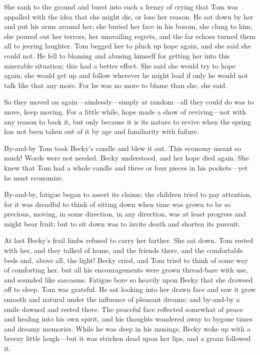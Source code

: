 \documentclass{book}
\begin{document}
She sank to the ground and burst into such a frenzy of crying that Tom was appalled with the idea that she might die, or lose her reason. He sat down by her and put his arms around her; she buried her face in his bosom, she clung to him, she poured out her terrors, her unavailing regrets, and the far echoes turned them all to jeering laughter. Tom begged her to pluck up hope again, and she said she could not. He fell to blaming and abusing himself for getting her into this miserable situation; this had a better effect. She said she would try to hope again, she would get up and follow wherever he might lead if only he would not talk like that any more. For he was no more to blame than she, she said.

So they moved on again—aimlessly—simply at random—all they could do was to move, keep moving. For a little while, hope made a show of reviving—not with any reason to back it, but only because it is its nature to revive when the spring has not been taken out of it by age and familiarity with failure.

By-and-by Tom took Becky’s candle and blew it out. This economy meant so much! Words were not needed. Becky understood, and her hope died again. She knew that Tom had a whole candle and three or four pieces in his pockets—yet he must economize.

By-and-by, fatigue began to assert its claims; the children tried to pay attention, for it was dreadful to think of sitting down when time was grown to be so precious, moving, in some direction, in any direction, was at least progress and might bear fruit; but to sit down was to invite death and shorten its pursuit.

At last Becky’s frail limbs refused to carry her farther. She sat down. Tom rested with her, and they talked of home, and the friends there, and the comfortable beds and, above all, the light! Becky cried, and Tom tried to think of some way of comforting her, but all his encouragements were grown thread-bare with use, and sounded like sarcasms. Fatigue bore so heavily upon Becky that she drowsed off to sleep. Tom was grateful. He sat looking into her drawn face and saw it grow smooth and natural under the influence of pleasant dreams; and by-and-by a smile dawned and rested there. The peaceful face reflected somewhat of peace and healing into his own spirit, and his thoughts wandered away to bygone times and dreamy memories. While he was deep in his musings, Becky woke up with a breezy little laugh—but it was stricken dead upon her lips, and a groan followed it.
\end{document}
